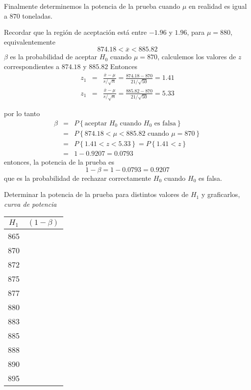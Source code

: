 \begin{frame}
\begin{frame}
Finalmente determinemos la potencia de la prueba cuando $\mu$ en realidad es igual a $870$ toneladas.

Recordar que la regi\'on de aceptaci\'on est\'a entre $-1.96$ y $1.96$, para $\mu=880$, equivalentemente $$874.18<\overline{x}<885.82$$
$\beta$ es la probabilidad de aceptar $H_{0}$ cuando $\mu=870$, calculemos los valores de $z$ correspondientes a $874.18$ y $885.82$ \medskip
Entonces
\begin{eqnarray*}
z_{1}&=&\frac{\overline{x}-\mu}{s/\sqrt{n}}=\frac{874.18-870}{21/\sqrt{50}}=1.41\\
z_{1}&=&\frac{\overline{x}-\mu}{s/\sqrt{n}}=\frac{885.82-870}{21/\sqrt{50}}=5.33
\end{eqnarray*}


por lo tanto
\begin{eqnarray*}
\beta&=&P\left\{\textrm{aceptar }H_{0}\textrm{ cuando }H_{0}\textrm{ es falsa}\right\}\\
&=&P\left\{874.18<\mu<885.82\textrm{ cuando }\mu=870\right\}\\
&=&P\left\{1.41<z<5.33\right\}=P\left\{1.41<z\right\}\\
&=&1-0.9207=0.0793
\end{eqnarray*}
entonces, la potencia de la prueba es
$$1-\beta=1-0.0793=0.9207$$ que es la probabilidad de rechazar correctamente $H_{0}$ cuando $H_{0}$ es falsa.






Determinar la potencia de la prueba para distintos valores de $H_{1}$ y graficarlos, \textit{curva de potencia}
\begin{center}
\begin{tabular}{c||c}
$H_{1}$ & $\left(1-\beta\right)$ \\\hline 
\hline 
865 &  \\ \hline 
870 &  \\ \hline 
872 &  \\ \hline 
875 &  \\ \hline 
877 &  \\ \hline 
880 &  \\ \hline 
883 &  \\ \hline 
885 &  \\ \hline 
888 &  \\ \hline 
890 &  \\ \hline 
895 &  \\ \hline 
\end{tabular} 

\end{center}







\end{frame}
\end{frame}
